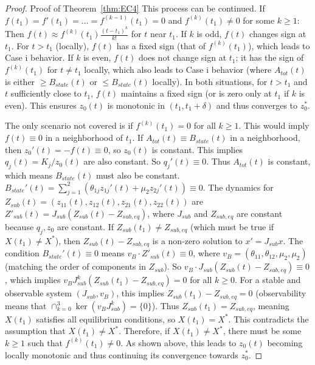 \begin{proof}{Proof of Theorem~\ref{thm:EC4}}
    This process can be continued.
    If $f(t_1)=f'(t_1)=\dots=f^{(k-1)}(t_1)=0$ and $f^{(k)}(t_1) \neq 0$ for some $k \ge 1$:
    Then $f(t) \approx f^{(k)}(t_1)\frac{(t-t_1)^k}{k!}$ for $t$ near $t_1$.
    If $k$ is odd, $f(t)$ changes sign at $t_1$.
    For $t>t_1$ (locally), $f(t)$ has a fixed sign (that of $f^{(k)}(t_1)$), which leads to Case i behavior.
    If $k$ is even, $f(t)$ does not change sign at $t_1$; it has the sign of $f^{(k)}(t_1)$ for $t \neq t_1$ locally, which also leads to Case i behavior (where $A_{tot}(t)$ is either $\ge B_{state}(t)$ or $\le B_{state}(t)$ locally).
    In both situations, for $t > t_1$ and $t$ sufficiently close to $t_1$, $f(t)$ maintains a fixed sign (or is zero only at $t_1$ if $k$ is even).
    This ensures $z_0(t)$ is monotonic in $(t_1, t_1+\delta)$ and thus converges to $z_0^*$.

    The only scenario not covered is if $f^{(k)}(t_1)=0$ for all $k \ge 1$.
    This would imply $f(t) \equiv 0$ in a neighborhood of $t_1$.
    If $A_{tot}(t) \equiv B_{state}(t)$ in a neighborhood, then $z_0'(t) = -f(t) \equiv 0$, so $z_0(t)$ is constant.
    This implies $q_j(t) = K_j/z_0(t)$ are also constant. So $q_j'(t) \equiv 0$.
    Thus $A_{tot}(t)$ is constant, which means $B_{state}(t)$ must also be constant.
    $B_{state}'(t) = \sum_{j=1}^{2}(\theta_{1j}z_{1j}'(t) + \mu_2z_{2j}'(t)) \equiv 0$.
    The dynamics for $Z_{sub}(t)=(z_{11}(t), z_{12}(t), z_{21}(t), z_{22}(t))$ are $Z'_{sub}(t) = J_{sub}(Z_{sub}(t) - Z_{sub,eq})$, where $J_{sub}$ and $Z_{sub,eq}$ are constant because $q_j, z_0$ are constant.
    If $Z_{sub}(t_1) \neq Z_{sub,eq}$ (which must be true if $X(t_1) \neq X^*$), then $Z_{sub}(t) - Z_{sub,eq}$ is a non-zero solution to $x' = J_{sub}x$.
    The condition $B_{state}'(t) \equiv 0$ means $v_B \cdot Z'_{sub}(t) \equiv 0$, where $v_B = (\theta_{11}, \theta_{12}, \mu_{2}, \mu_{2})$ (matching the order of components in $Z_{sub}$).
    So $v_B \cdot J_{sub}(Z_{sub}(t) - Z_{sub,eq}) \equiv 0$, which implies $v_B J_{sub}^k (Z_{sub}(t_1) - Z_{sub,eq}) = 0$ for all $k \ge 0$.
    For a stable and observable system $(J_{sub}, v_B)$, this implies $Z_{sub}(t_1) - Z_{sub,eq} = 0$ (observability means that $\cap_{k=0}^{3} \ker(v_B J_{sub}^k) = \{0\}$).
    Thus $Z_{sub}(t_1) = Z_{sub,eq}$, meaning $X(t_1)$ satisfies all equilibrium conditions, so $X(t_1)=X^*$.
    This contradicts the assumption that $X(t_1) \neq X^*$.
    Therefore, if $X(t_1) \neq X^*$, there must be some $k \ge 1$ such that $f^{(k)}(t_1) \neq 0$.
    As shown above, this leads to $z_0(t)$ becoming locally monotonic and thus continuing its convergence towards $z_0^*$.


\end{proof}
